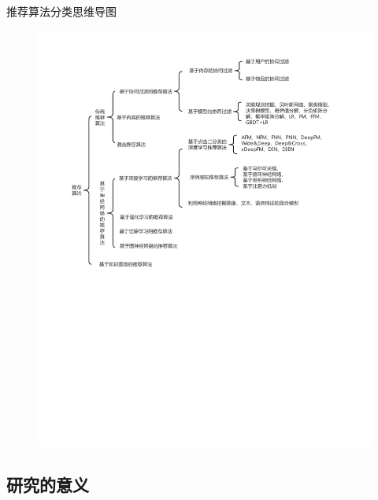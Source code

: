 \documentclass[serif]{beamer}
\begin{document}
  \begin{frame}{推荐算法分类思维导图}
       \begin{figure}[t]
       	     \centering
       	    \includegraphics[scale=0.55]{RA_clsssification.pdf}
       \end{figure}
  \end{frame}

  \subsection{研究的意义}
\end{document}
